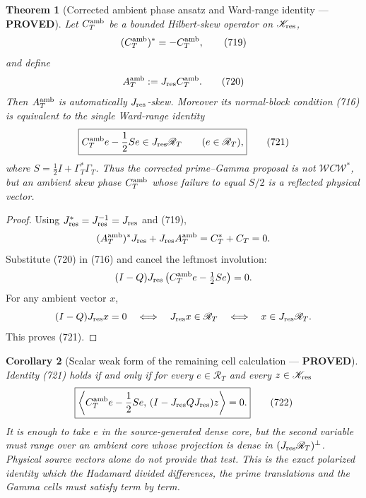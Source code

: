 \documentclass[11pt]{article}
\newtheorem{theorem}{Theorem}
\newtheorem{corollary}[theorem]{Corollary}
\newcommand{\PROVED}{\textcolor{green!45!black}{\textbf{PROVED}}}
\begin{document}
\begin{theorem}[Corrected ambient phase ansatz and Ward-range identity ---
\PROVED]
Let \(C_T^{\rm amb}\) be a bounded Hilbert-skew operator on
\(\mathscr K_{\rm res}\),
\begin{equation}
 (C_T^{\rm amb})^*=-C_T^{\rm amb},                 \tag{719}
\end{equation}
and define
\begin{equation}
 A_T^{\rm amb}:=J_{\rm res}C_T^{\rm amb}.           \tag{720}
\end{equation}
Then \(A_T^{\rm amb}\) is automatically \(J_{\rm res}\)-skew.  Moreover
its normal-block condition (716) is equivalent to the single Ward-range
identity
\begin{equation}
 \boxed{
 C_T^{\rm amb}e-\frac12Se\in
 J_{\rm res}\mathscr R_T
 \qquad(e\in\mathscr R_T),}                         \tag{721}
\end{equation}
where \(S=\frac12I+\Gamma_T^*\Gamma_T\).
Thus the corrected prime--Gamma proposal is not
\(\mathcal WC\mathcal W^*\), but an ambient skew phase \(C_T^{\rm amb}\)
whose failure to equal \(S/2\) is a reflected physical vector.
\end{theorem}

\begin{proof}
Using \(J_{\rm res}^*=J_{\rm res}^{-1}=J_{\rm res}\) and (719),
\[
 (A_T^{\rm amb})^*J_{\rm res}
 +J_{\rm res}A_T^{\rm amb}
 =C_T^*+C_T=0.
\]
Substitute (720) in (716) and cancel the leftmost involution:
\[
 (I-Q)J_{\rm res}
 \left(C_T^{\rm amb}e-\tfrac12Se\right)=0.
\]
For any ambient vector \(x\),
\[
 (I-Q)J_{\rm res}x=0
 \quad\Longleftrightarrow\quad
 J_{\rm res}x\in\mathscr R_T
 \quad\Longleftrightarrow\quad
 x\in J_{\rm res}\mathscr R_T.
\]
This proves (721).
\end{proof}

\begin{corollary}[Scalar weak form of the remaining cell calculation ---
\PROVED]
Identity (721) holds if and only if for every
\(e\in\mathscr R_T\) and every \(z\in\mathscr K_{\rm res}\)
\begin{equation}
 \boxed{
 \left\langle C_T^{\rm amb}e-\frac12Se,\,
 (I-J_{\rm res}QJ_{\rm res})z\right\rangle=0.}      \tag{722}
\end{equation}
It is enough to take \(e\) in the source-generated dense core, but the
second variable must range over an ambient core whose projection is dense
in \((J_{\rm res}\mathscr R_T)^\perp\).  Physical source vectors alone do
not provide that test.  This is the exact polarized identity which the
Hadamard divided differences, the prime translations and the Gamma cells
must satisfy term by term.
\end{corollary}
\end{document}
